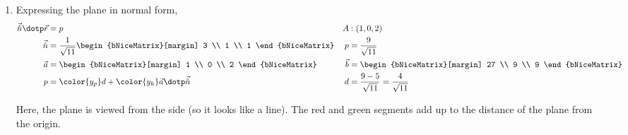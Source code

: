 \begin{enumerate}
    \item Expressing the plane in normal form,
          \begin{align}
              \vec{\hat{n}} \dotp \vec{r} & = p                           &
              A                           & : (1, 0, 2)                     \\
              \vec{\hat{n}}               & = \frac{1}{\sqrt{11}}
              \begin{bNiceMatrix}[margin]
                  3 \\ 1 \\ 1
              \end{bNiceMatrix} &
              p                           & = \frac{9}{\sqrt{11}}           \\
              \vec{a}                     & = \begin{bNiceMatrix}[margin]
                                                  1 \\ 0 \\ 2
                                              \end{bNiceMatrix} &
              \vec{b}                     & = \begin{bNiceMatrix}[margin]
                                                  27 \\ 9 \\ 9
                                              \end{bNiceMatrix}    \\
              p                           & = {\color{y_p}d}
              + {\color{y_h} \vec{a}
              \dotp \vec{\hat{n}}}        &
              d                           & = \frac{9 - 5}{\sqrt{11}}
              = \frac{4}{\sqrt{11}}
          \end{align}

          \begin{figure}[H]
              \centering
          \end{figure}
          Here, the plane is viewed from the side (so it looks like a line). The red
          and green segments add up to the distance of the plane from the origin.


\end{enumerate}
